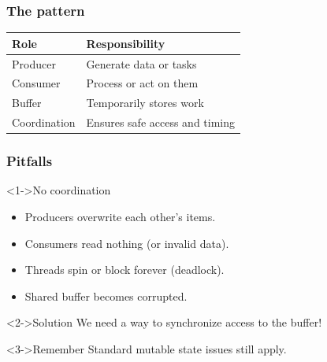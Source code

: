 \documentclass[xcolor={dvipsnames,svgnames},aspectratio=169]{beamer}
\begin{document}
\begin{frame}[fragile]
  \frametitle{The pattern}

  \begin{table}[h]
    \centering
    \begin{tabularx}{\textwidth}{|l|X|}
      \hline
      \textbf{Role} & \textbf{Responsibility} \\
      \hline
      Producer & Generate data or tasks \\
      \hline
      Consumer & Process or act on them \\
      \hline
      Buffer & Temporarily stores work \\
      \hline
      Coordination & Ensures safe access and timing \\
      \hline
    \end{tabularx}
  \end{table}
\end{frame}

\begin{frame}[fragile]
  \frametitle{\faExclamationTriangle \quad Pitfalls}

  \begin{block}<1->{\faExclamationTriangle \quad No coordination}
    \begin{itemize}
    \item[\faUserInjured] Producers overwrite each other's items.
    \item[\faUserInjured] Consumers read nothing (or invalid data).
    \item[\faUserInjured] Threads spin or block forever (deadlock).
    \item[\faUserInjured] Shared buffer becomes corrupted.
    \end{itemize}
  \end{block}
  \vspace{0.2cm}
  \begin{block}<2->{\faBriefcaseMedical \quad Solution}
    We need a way to synchronize access to the buffer!
  \end{block}
    \vspace{0.2cm}
  \begin{block}<3->{\faExclamationTriangle \quad Remember}
    Standard mutable state issues still apply.
  \end{block}
\end{frame}
\end{document}
